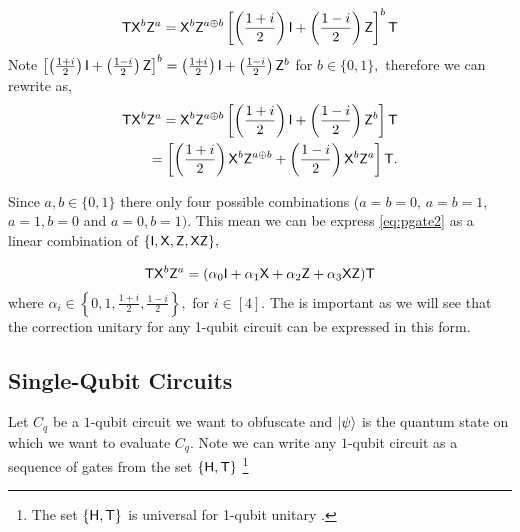 \begin{equation}
\label{eq:pgate1}
{\sf T} {\sf X}^b {\sf Z}^a={\sf X}^b {\sf Z}^{a\oplus b}\left[\left(\frac{1+i}{2}\right) {\sf I} + \left(\frac{1-i}{2}\right){\sf Z}\right]^b {\sf T}
\end{equation}
Note  $\left[\left(\frac{1+i}{2}\right) {\sf I} + \left(\frac{1-i}{2}\right){\sf Z}\right]^b=\left(\frac{1+i}{2}\right) {\sf I} + \left(\frac{1-i}{2}\right){\sf Z}^b$ for $b \in \{0,1\},$ therefore we can rewrite   as,
\begin{equation}
\label{eq:pgate2}
\begin{aligned}
{\sf T} {\sf X}^b {\sf Z}^a={\sf X}^b {\sf Z}^{a\oplus b}\left[\left(\frac{1+i}{2}\right) {\sf I} + \left(\frac{1-i}{2}\right){\sf Z}^b\right] {\sf T} \\
=\left[\left(\frac{1+i}{2}\right) {\sf X}^b {\sf Z}^{a\oplus b} + \left(\frac{1-i}{2}\right){\sf X}^b {\sf Z}^a\right] {\sf T}. \\
\end{aligned}
\end{equation}

Since $a,b\in\{0,1\}$ there only four possible combinations ($a=b=0$, $a=b=1$, $a=1,b=0$ and $a=0,b=1).$ This mean we can be express  \cref{eq:pgate2} as a linear combination of $\{{\sf I}, {\sf X}, {\sf Z}, {\sf X} {\sf Z}\},$

\begin{equation}
\label{eq:pgate3}
\begin{aligned}
{\sf T} {\sf X}^b {\sf Z}^a= (\alpha_0 {\sf I} +  \alpha_1 {\sf X} + \alpha_2 {\sf Z} + \alpha_3 {\sf X}{\sf Z}){\sf T} \\
\end{aligned}
\end{equation}
where $\alpha_i \in\left\{0,1, \frac{1+i}{2}, \frac{1-i}{2}\right\},$ for  $i\in[4].$ The  is important as we will see that the correction unitary for any 1-qubit circuit can be expressed in this form.

\subsection{Single-Qubit Circuits}
\label{sec:1-qubit}

Let $C_q$ be a $1$-qubit circuit we want to obfuscate and ${\lvert}\psi\rangle$ is the quantum state on which we want to evaluate $C_q.$ Note we can write any $1$-qubit circuit as a sequence of gates from the set $\{{\sf H}, {\sf T}\}$ \footnote{The set $\{{\sf H},  {\sf T}\}$ is universal for 1-qubit unitary \cite{KLM07}.}


